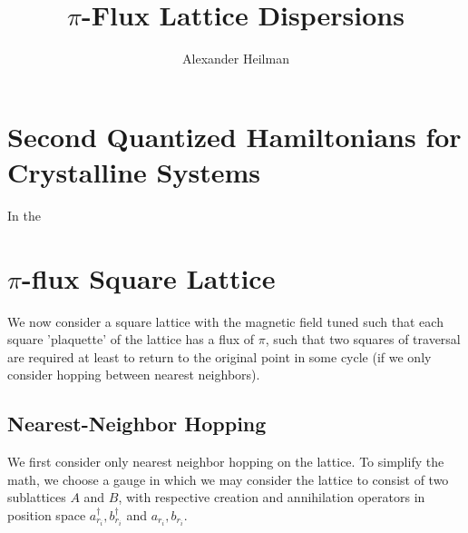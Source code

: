 \documentclass[10pt,a4paper]{article}\usepackage[]{graphicx}\usepackage[]{color}
\title{$\pi$-Flux Lattice Dispersions}
\author{Alexander Heilman}
\begin{document}
\vspace{-3cm}
 
\maketitle

\begin{multicols}{2}

\section{Second Quantized Hamiltonians for Crystalline Systems}
In the 


\section{$\pi$-flux Square Lattice}
We now consider a square lattice with the magnetic field tuned such that each square 'plaquette' of the lattice has a flux of $\pi$, such that two squares of traversal are required at least to return to the original point in some cycle (if we only consider hopping between nearest neighbors).

\subsection{Nearest-Neighbor Hopping}

We first consider only nearest neighbor hopping on the lattice. To simplify the math, we choose a gauge in which we may consider the lattice to consist of two sublattices $A$ and $B$, with respective creation and annihilation operators in position space $a^{\dagger}_{r_i},b^{\dagger}_{r_i}$ and $a_{r_i},b_{r_i}$.


\end{multicols}
\end{document}
